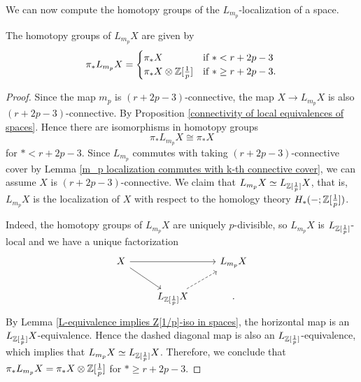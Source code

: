We can now compute the homotopy groups of the $L_{m_p}$-localization of a space.
\begin{corollary}
\label{computation of the htpy groups of L_m_p X}
	The homotopy groups of $L_{m_p}X$ are given by
	\[
	\pi_* L_{m_p}X = \begin{cases}
		\pi_*X & \text{if $*< r+2p-3$}\\
		\pi_*X\otimes {\mathbb{Z}}[\frac{1}{p}] & \text{if $*\geq r+2p-3$}.
	\end{cases}
	\]
\end{corollary}
\begin{proof}
	Since the map $m_p$ is $(r+2p-3)$-connective, the map $X \to L_{m_p}X$ is also $(r+2p-3)$-connective. By Proposition \ref{connectivity of local equivalences of spaces}. Hence there are isomorphisms in homotopy groups
	$$
	\pi_* L_{m_p}X \cong \pi_* X
	$$
	for $*<r+2p-3$. 
	Since $L_{m_p}$ commutes with taking $(r+2p-3)$-connective cover by Lemma \ref{m_p localization commutes with k-th connective cover}, we can assume $X$ is $(r+2p-3)$-connective. 
	We claim that $L_{m_p}X\simeq L_{{\mathbb{Z}}[\frac{1}{p}]}X$, that is, $L_{m_p}X$ is the localization of $X$ with respect to the homology theory $H_{*}(-;{\mathbb{Z}}[\frac{1}{p}])$.
	
	Indeed, the homotopy groups of $L_{m_{p}}X$ are uniquely $p$-divisible, so $L_{m_{p}}X$ is $L_{{\mathbb{Z}}[\frac{1}{p}]}$-local and we have a unique factorization
	\[
	\begin{tikzcd}
		X &   & L_{m_p}X\\
		  & L_{\BZ[\frac{1}{p}]}X &
	\arrow[from=1-1, to=1-3]
	\arrow[from=1-1, to=2-2]
	\arrow[from=2-2, to=1-3, dashed].
	\end{tikzcd}
	\]
By Lemma \ref{L-equivalence implies Z[1/p]-iso in spaces}, the horizontal map is an $L_{{\mathbb{Z}}[\frac{1}{p}]}X$-equivalence.
	Hence the dashed diagonal map is also an $L_{{\mathbb{Z}}[\frac{1}{p}]}$-equivalence, which implies that $L_{m_p}X\simeq L_{{\mathbb{Z}}[\frac{1}{p}]}X$. Therefore, we conclude that $\pi_*L_{m_p}X=\pi_*X\otimes {\mathbb{Z}}[\frac{1}{p}]$ for $*\geq r+2p-3$.
	
\end{proof}

